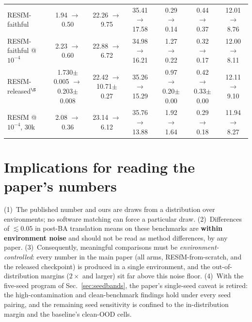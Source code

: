 \documentclass[10pt,twocolumn,letterpaper]{article}
\begin{document}
\begin{table}[t]
{\begin{tabular}{lcccccc}
RESfM-faithful & 1.94 $\to$ 0.50 & 22.26 $\to$ 9.75 & 35.41 $\to$ 17.58 & 0.29 $\to$ 0.14 & 0.44 $\to$ 0.37 & 12.01 $\to$ 8.76\\
RESfM-faithful @$10^{-4}$ & 2.23 $\to$ 0.60 & 22.88 $\to$ 6.72 & 34.98 $\to$ 16.21 & 1.27 $\to$ 0.22 & 0.32 $\to$ 0.17 & 12.00 $\to$ 8.11\\
RESfM-released$^{\S}$ & 1.730$\pm$0.005 $\to$ 0.203$\pm$0.008 & 22.42 $\to$ 10.71$\pm$0.27 & 35.26 $\to$ 15.29 & 0.97 $\to$ 0.20$\pm$0.00 & 0.42 $\to$ 0.33$\pm$0.00 & 12.11 $\to$ 9.10\\
RESfM @$10^{-4}$, 30k & 2.08 $\to$ 0.36 & 23.14 $\to$ 6.12 & 35.76 $\to$ 13.88 & 1.92 $\to$ 1.64 & 0.29 $\to$ 0.18 & 11.94 $\to$ 8.27\\
\bottomrule
\end{tabular}}%
\end{table}

\section{Implications for reading the paper's numbers}\label{sec:implications}
(1)~The published number and ours are draws from a distribution over environments; no
software matching can force a particular draw. (2)~Differences of $\lesssim\!0.05$ in
post-BA translation means on these benchmarks are \textbf{within environment noise} and
should not be read as method differences, by any paper. (3)~Consequently, meaningful
comparisons must be \emph{environment-controlled}: every number in the main paper
(all arms, RESfM-from-scratch, and the released checkpoint) is produced in a single
environment, and the out-of-distribution margins ($2\times$ and larger) sit far above this
noise floor. (4)~With the five-seed program of Sec.~\ref{sec:seedbands}, the paper's
single-seed caveat is retired: the high-contamination and clean-benchmark findings hold
under every seed pairing, and the remaining seed sensitivity is confined to the
in-distribution margin and the baseline's clean-OOD cells.
\end{document}

